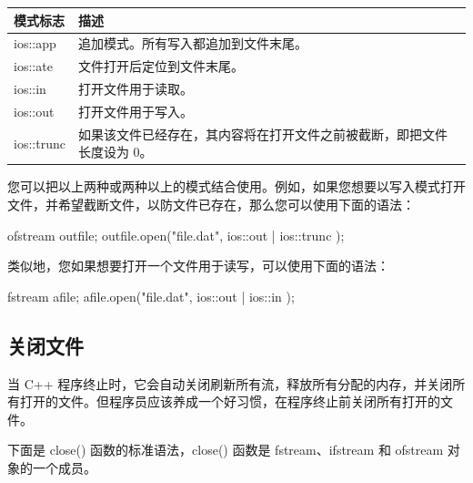 \documentclass[
]{article}
\newenvironment{Shaded}{}{}
\newcommand{\NormalTok}[1]{#1}
\newcommand{\OperatorTok}[1]{\textcolor[rgb]{0.40,0.40,0.40}{#1}}
\newcommand{\StringTok}[1]{\textcolor[rgb]{0.25,0.44,0.63}{#1}}
\begin{document}
\begin{longtable}[]{@{}ll@{}}
\toprule
模式标志 & 描述 \\
\midrule
\endhead
ios::app & 追加模式。所有写入都追加到文件末尾。 \\
ios::ate & 文件打开后定位到文件末尾。 \\
ios::in & 打开文件用于读取。 \\
ios::out & 打开文件用于写入。 \\
ios::trunc &
如果该文件已经存在，其内容将在打开文件之前被截断，即把文件长度设为
0。 \\
\bottomrule
\end{longtable}

您可以把以上两种或两种以上的模式结合使用。例如，如果您想要以写入模式打开文件，并希望截断文件，以防文件已存在，那么您可以使用下面的语法：

\begin{Shaded}
\begin{Highlighting}[]
\NormalTok{ofstream outfile}\OperatorTok{;}
\NormalTok{outfile}\OperatorTok{.}\NormalTok{open}\OperatorTok{(}\StringTok{"file.dat"}\OperatorTok{,}\NormalTok{ ios}\OperatorTok{::}\NormalTok{out }\OperatorTok{|}\NormalTok{ ios}\OperatorTok{::}\NormalTok{trunc }\OperatorTok{);}
\end{Highlighting}
\end{Shaded}

类似地，您如果想要打开一个文件用于读写，可以使用下面的语法：

\begin{Shaded}
\begin{Highlighting}[]
\NormalTok{fstream  afile}\OperatorTok{;}
\NormalTok{afile}\OperatorTok{.}\NormalTok{open}\OperatorTok{(}\StringTok{"file.dat"}\OperatorTok{,}\NormalTok{ ios}\OperatorTok{::}\NormalTok{out }\OperatorTok{|}\NormalTok{ ios}\OperatorTok{::}\NormalTok{in }\OperatorTok{);}
\end{Highlighting}
\end{Shaded}

\hypertarget{ux5173ux95edux6587ux4ef6}{%
\subsection{关闭文件}\label{ux5173ux95edux6587ux4ef6}}

当 C++
程序终止时，它会自动关闭刷新所有流，释放所有分配的内存，并关闭所有打开的文件。但程序员应该养成一个好习惯，在程序终止前关闭所有打开的文件。

下面是 close() 函数的标准语法，close() 函数是 fstream、ifstream 和
ofstream 对象的一个成员。
\end{document}
